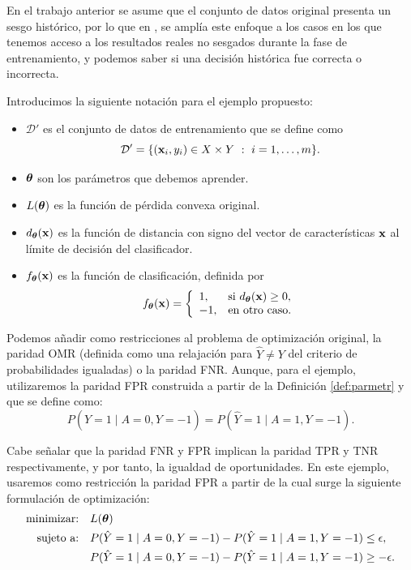 \documentclass[oneside,openright,titlepage,numbers=noenddot,openany,headinclude,footinclude=true,
cleardoublepage=empty,abstractoff,BCOR=5mm,paper=a4,fontsize=12pt,main=spanish]{scrreprt}
\begin{document}
En el trabajo anterior se asume que el conjunto de datos original presenta un sesgo histórico, por lo que en \cite{disparate2017}, se amplía este enfoque a los casos en los que tenemos acceso a los resultados reales no sesgados durante la fase de entrenamiento, y podemos saber si una decisión histórica fue correcta o incorrecta.

\begin{notation}
Introducimos la siguiente notación para el ejemplo propuesto:

\begin{itemize}
    \item $\mathcal{D}'$ es el conjunto de datos de entrenamiento que se define como $$\mathcal{D}'=\{(\textbf{x}_i,y_i) \in X \times Y \ : \ i=1,\dots,m\}.$$
    \item $\bm{\theta}$ son los parámetros que debemos aprender.
    \item $L(\bm{\theta})$ es la función de pérdida convexa original.
    \item $d_{\bm{\theta}}(\textbf{x})$ es la función de distancia con signo del vector de características $\textbf{x}$ al límite de decisión del clasificador.
    \item $f_{\bm{\theta}}(\textbf{x})$ es la función de clasificación, definida por $$f_{\bm{\theta}}(\textbf{x})=\left \{
    \begin{array}{l l}
    1, & \mbox{si } d_{\bm{\theta}}(\textbf{x}) \geq 0, \\
    -1, & \mbox{en otro caso}.
    \end{array}
    \right.$$
\end{itemize}
\end{notation}

Podemos añadir como restricciones al problema de optimización original, la paridad OMR (definida como una relajación para $\hat{Y}\neq Y$ del criterio de probabilidades igualadas) o la paridad FNR. Aunque, para el ejemplo, utilizaremos la paridad FPR construida a partir de la Definición \ref{def:parmetr} y que se define como: $$P(\hat{Y}=1 \mid A=0, Y=-1)=P(\hat{Y}=1 \mid A=1, Y=-1).$$

\clearpage

Cabe señalar que la paridad FNR y FPR implican la paridad TPR y TNR respectivamente, y por tanto, la igualdad de oportunidades. En este ejemplo, usaremos como restricción la paridad FPR a partir de la cual surge la siguiente formulación de optimización:
\begin{equation}\label{eq:restricciones}
\begin{split}
\text{minimizar:} &\quad L(\bm{\theta})\\
\text{sujeto a:} &\quad P(\hat{Y}=1 \mid A=0, Y=-1)-P(\hat{Y}=1 \mid A=1, Y=-1) \leq \epsilon,\\
&\quad  P(\hat{Y}=1 \mid A=0, Y=-1)-P(\hat{Y}=1 \mid A=1, Y=-1) \geq -\epsilon.
\end{split}
\end{equation}
\end{document}
